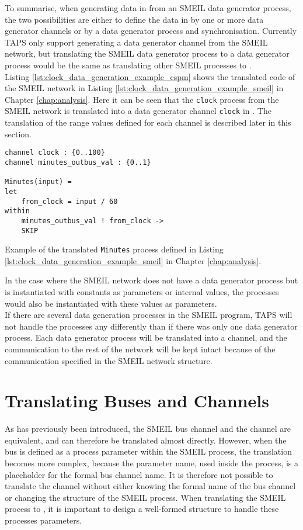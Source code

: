 To summarise, when generating data in \cspm{} from an SMEIL data generator process, the two possibilities are either to define the data in \cspm{} by one or more data generator channels or by a data generator process and synchronisation.
Currently TAPS only support generating a data generator channel from the SMEIL network, but translating the SMEIL data generator process to a \cspm{} data generator process would be the same as translating other SMEIL processes to \cspm{}.\\

Listing \ref{lst:clock_data_generation_example_cspm} shows the translated code of the SMEIL network in Listing \ref{lst:clock_data_generation_example_smeil} in Chapter \ref{chap:analysis}. Here it can be seen that the \texttt{clock} process from the SMEIL network is translated into a data generator channel \texttt{clock} in \cspm{}. The translation of the range values defined for each channel is described later in this section.
\begin{listing}
\begin{verbatim}
channel clock : {0..100}
channel minutes_outbus_val : {0..1}

Minutes(input) =
let
    from_clock = input / 60
within
    minutes_outbus_val ! from_clock ->
    SKIP

\end{verbatim}
\caption{Example of the translated \texttt{Minutes} process defined in Listing \ref{lst:clock_data_generation_example_smeil} in Chapter \ref{chap:analysis}.}
\label{lst:clock_data_generation_example_cspm}
\end{listing}
In the case where the SMEIL network does not have a data generator process but is instantiated with constants as parameters or internal values, the \cspm{} processes would also be instantiated with these values as parameters.\\

If there are several data generation processes in the SMEIL program, TAPS will not handle the processes any differently than if there was only one data generator process. Each data generator process will be translated into a \cspm{} channel, and the communication to the rest of the network will be kept intact because of the communication specified in the SMEIL network structure.

\section{Translating Buses and Channels}
As has previously been introduced, the SMEIL bus channel and the \cspm{} channel are equivalent, and can therefore be translated almost directly. However, when the bus is defined as a process parameter within the SMEIL process, the translation becomes more complex, because the parameter name, used inside the process, is a placeholder for the formal bus channel name. It is therefore not possible to translate the channel without either knowing the formal name of the bus channel or changing the structure of the SMEIL process.
When translating the SMEIL process to \cspm{}, it is important to design a well-formed structure to handle these processes parameters.\\

